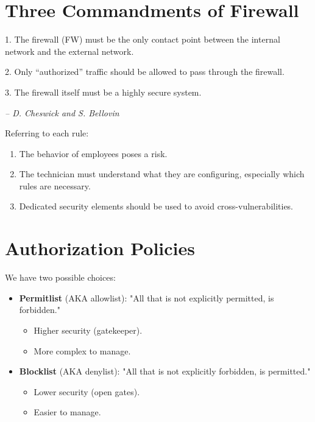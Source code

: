 \section{Three Commandments of Firewall}
\begin{center}
    1. The firewall (FW) must be the only contact point between the internal network and the external network.
\end{center}

\begin{center}
    2. Only “authorized” traffic should be allowed to pass through the firewall.
\end{center}

\begin{center}
    3. The firewall itself must be a highly secure system.
\end{center}

\emph{-- D. Cheswick and S. Bellovin}

\noindent Referring to each rule:
\begin{enumerate}
    \item The behavior of employees poses a risk.
    \item The technician must understand what they are configuring, especially which rules are necessary.
    \item Dedicated security elements should be used to avoid cross-vulnerabilities.
\end{enumerate}

\section{Authorization Policies}
We have two possible choices:
\begin{itemize}
    \item \textbf{Permitlist} (AKA allowlist): "All that is not explicitly permitted, is forbidden."
    \begin{itemize}
        \item Higher security (gatekeeper).
        \item More complex to manage.
    \end{itemize}
    \item \textbf{Blocklist} (AKA denylist): "All that is not explicitly forbidden, is permitted."
    \begin{itemize}
        \item Lower security (open gates).
        \item Easier to manage.
    \end{itemize}
\end{itemize}

